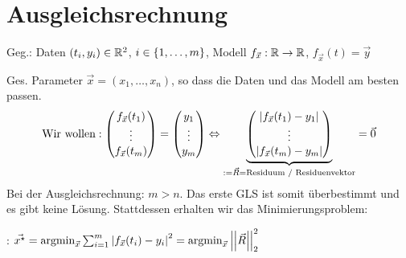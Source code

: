 \section{Ausgleichsrechnung}


\vspace{1\baselineskip}


\vspace{1\baselineskip}


Geg.: Daten $(t_i,y_i) \in \mathbb{R}^2$, $i \in \left\{ 1,\dots,m \right\}$, Modell
$f_{\vec{x}}: \mathbb{R} \rightarrow \mathbb{R}$, $f_{\vec{x}} (t) = \vec{y}$

Ges. Parameter $\vec{x} = (x_1,\dots,x_n)$, so dass die Daten und das Modell am besten passen.
\begin{align*}
    \text{Wir wollen}:
    \begin{pmatrix}
        f_{\vec{x}} (t_1) \\ \vdots \\ f_{\vec{x}} (t_m)
    \end{pmatrix} = \begin{pmatrix}
        y_1 \\ \vdots \\ y_m
    \end{pmatrix} \Leftrightarrow
    \underbrace{
    \begin{pmatrix}
        \left\vert f_{\vec{x}} (t_1) - y_1 \right\vert \\ \vdots \\ \left\vert f_{\vec{x}} (t_m) - y_m \right\vert
    \end{pmatrix}
    }_{:=\vec{R} = \text{Residuum / Residuenvektor}}
    = \vec{0}
\end{align*}
Bei der Ausgleichsrechnung: $m > n$. Das erste GLS ist somit überbestimmt und es gibt keine
Lösung. Stattdessen erhalten wir das Minimierungsproblem:

: $\vec{x^\star} = \text{argmin}_{\vec{x}} \sum_{i=1}^{m}
    \left\vert f_{\vec{x}} (t_i) - y_i \right\vert^2 = \text{argmin}_{\vec{x}} \left\vert\left\vert \vec{R} \right\vert\right\vert_2^2$

\vspace{1\baselineskip}

\underline{}

